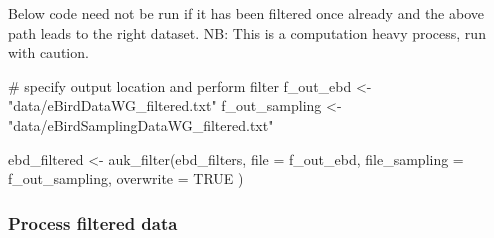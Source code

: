 \documentclass[]{article}
\newenvironment{Shaded}{}{}
\newcommand{\CommentTok}[1]{\textcolor[rgb]{0.00,0.50,0.00}{#1}}
\newcommand{\DataTypeTok}[1]{#1}
\newcommand{\KeywordTok}[1]{\textcolor[rgb]{0.00,0.00,1.00}{#1}}
\newcommand{\NormalTok}[1]{#1}
\newcommand{\OperatorTok}[1]{#1}
\newcommand{\OtherTok}[1]{\textcolor[rgb]{1.00,0.25,0.00}{#1}}
\newcommand{\StringTok}[1]{\textcolor[rgb]{0.00,0.50,0.50}{#1}}
\begin{document}
\begin{Shaded}
\end{Shaded}

Below code need not be run if it has been filtered once already and the above path leads to the right dataset. NB: This is a computation heavy process, run with caution.

\begin{Shaded}
\begin{Highlighting}[]

\CommentTok{# specify output location and perform filter}
\NormalTok{f_out_ebd <-}\StringTok{ "data/eBirdDataWG_filtered.txt"}
\NormalTok{f_out_sampling <-}\StringTok{ "data/eBirdSamplingDataWG_filtered.txt"}
\end{Highlighting}
\end{Shaded}

\begin{Shaded}
\begin{Highlighting}[]
\NormalTok{ebd_filtered <-}\StringTok{ }\KeywordTok{auk_filter}\NormalTok{(ebd_filters,}
  \DataTypeTok{file =}\NormalTok{ f_out_ebd,}
  \DataTypeTok{file_sampling =}\NormalTok{ f_out_sampling, }\DataTypeTok{overwrite =} \OtherTok{TRUE}
\NormalTok{)}
\end{Highlighting}
\end{Shaded}

\hypertarget{process-filtered-data}{%
\subsubsection{Process filtered data}\label{process-filtered-data}}
\end{document}
